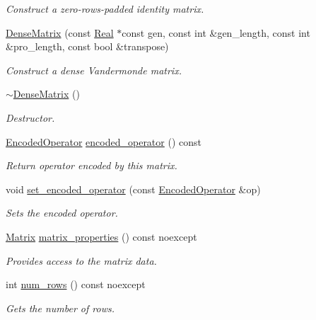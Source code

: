\begin{DoxyCompactItemize}
\begin{DoxyCompactList}\small\item\em Construct a zero-\/rows-\/padded identity matrix. \end{DoxyCompactList}\item 
\hyperlink{classmtk_1_1DenseMatrix_acedaf4058916614d66a18381e624a21d}{Dense\+Matrix} (const \hyperlink{group__c01-roots_gac080bbbf5cbb5502c9f00405f894857d}{Real} $\ast$const gen, const int \&gen\+\_\+length, const int \&pro\+\_\+length, const bool \&transpose)
\begin{DoxyCompactList}\small\item\em Construct a dense Vandermonde matrix. \end{DoxyCompactList}\item 
\hyperlink{classmtk_1_1DenseMatrix_a8d4a0df33bd4e4edf5d2fe5539885b85}{$\sim$\+Dense\+Matrix} ()
\begin{DoxyCompactList}\small\item\em Destructor. \end{DoxyCompactList}\item 
\hyperlink{group__c02-enums_ga9b50023bfb2692219d2915feade94f80}{Encoded\+Operator} \hyperlink{classmtk_1_1DenseMatrix_ab4ba807bef5282875d2136c456794f11}{encoded\+\_\+operator} () const 
\begin{DoxyCompactList}\small\item\em Return operator encoded by this matrix. \end{DoxyCompactList}\item 
void \hyperlink{classmtk_1_1DenseMatrix_ac0f824b0fec88c4fb42e77b7550fb0d3}{set\+\_\+encoded\+\_\+operator} (const \hyperlink{group__c02-enums_ga9b50023bfb2692219d2915feade94f80}{Encoded\+Operator} \&op)
\begin{DoxyCompactList}\small\item\em Sets the encoded operator. \end{DoxyCompactList}\item 
\hyperlink{classmtk_1_1Matrix}{Matrix} \hyperlink{classmtk_1_1DenseMatrix_a5aa83a0643f27a4652ea97630edf7143}{matrix\+\_\+properties} () const noexcept
\begin{DoxyCompactList}\small\item\em Provides access to the matrix data. \end{DoxyCompactList}\item 
int \hyperlink{classmtk_1_1DenseMatrix_a53f3afb3b6a8d21854458aaa9663cc74}{num\+\_\+rows} () const noexcept
\begin{DoxyCompactList}\small\item\em Gets the number of rows. \end{DoxyCompactList}\item 

\end{DoxyCompactItemize}

